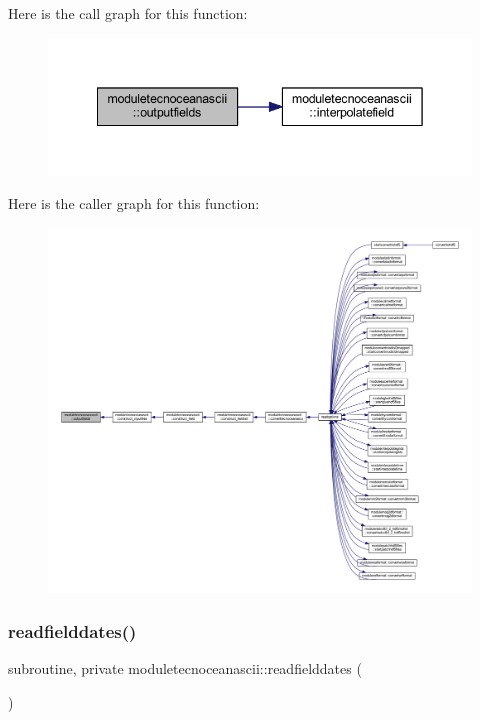 Here is the call graph for this function\+:\nopagebreak
\begin{figure}[H]
\begin{center}
\leavevmode
\includegraphics[width=342pt]{namespacemoduletecnoceanascii_a690ef71c676ca809af1adce385db6855_cgraph}
\end{center}
\end{figure}
Here is the caller graph for this function\+:\nopagebreak
\begin{figure}[H]
\begin{center}
\leavevmode
\includegraphics[width=350pt]{namespacemoduletecnoceanascii_a690ef71c676ca809af1adce385db6855_icgraph}
\end{center}
\end{figure}
\mbox{\label{namespacemoduletecnoceanascii_a46dae8318879d56217ce0452e09fa5a5}} 
\subsubsection{\texorpdfstring{readfielddates()}{readfielddates()}}
{\footnotesize\ttfamily subroutine, private moduletecnoceanascii\+::readfielddates (\begin{DoxyParamCaption}{ }\end{DoxyParamCaption})\hspace{0.3cm}{\ttfamily [private]}}

